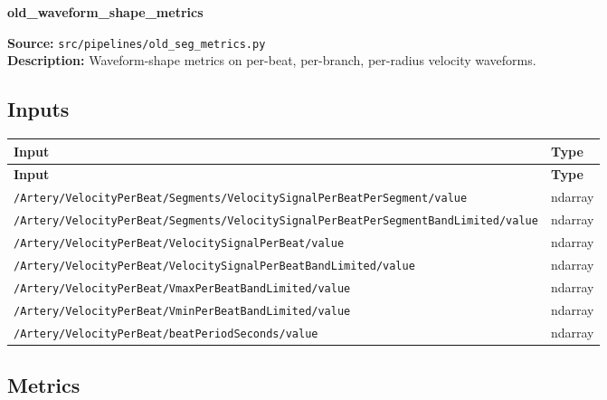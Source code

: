 \documentclass[11pt]{article}
\begin{document}
\begin{center}
\LARGE\textbf{old\_waveform\_shape\_metrics}
\end{center}
\textbf{Source:} \texttt{src/\allowbreak{}pipelines/\allowbreak{}old\_\allowbreak{}seg\_\allowbreak{}metrics.py}\\
\textbf{Description:} Waveform-shape metrics on per-beat, per-branch, per-radius velocity waveforms.

\subsection*{Inputs}
\begin{longtable}{|p{}|p{}|}
\hline
\textbf{Input} & \textbf{Type} \\ \hline
\endfirsthead
\hline
\textbf{Input} & \textbf{Type} \\ \hline
\endhead
{\scriptsize \texttt{/\allowbreak{}Artery/\allowbreak{}VelocityPerBeat/\allowbreak{}Segments/\allowbreak{}VelocitySignalPerBeatPerSegment/\allowbreak{}value}} & ndarray \\ \hline
{\scriptsize \texttt{/\allowbreak{}Artery/\allowbreak{}VelocityPerBeat/\allowbreak{}Segments/\allowbreak{}VelocitySignalPerBeatPerSegmentBandLimited/\allowbreak{}value}} & ndarray \\ \hline
{\scriptsize \texttt{/\allowbreak{}Artery/\allowbreak{}VelocityPerBeat/\allowbreak{}VelocitySignalPerBeat/\allowbreak{}value}} & ndarray \\ \hline
{\scriptsize \texttt{/\allowbreak{}Artery/\allowbreak{}VelocityPerBeat/\allowbreak{}VelocitySignalPerBeatBandLimited/\allowbreak{}value}} & ndarray \\ \hline
{\scriptsize \texttt{/\allowbreak{}Artery/\allowbreak{}VelocityPerBeat/\allowbreak{}VmaxPerBeatBandLimited/\allowbreak{}value}} & ndarray \\ \hline
{\scriptsize \texttt{/\allowbreak{}Artery/\allowbreak{}VelocityPerBeat/\allowbreak{}VminPerBeatBandLimited/\allowbreak{}value}} & ndarray \\ \hline
{\scriptsize \texttt{/\allowbreak{}Artery/\allowbreak{}VelocityPerBeat/\allowbreak{}beatPeriodSeconds/\allowbreak{}value}} & ndarray \\ \hline
\end{longtable}

\subsection*{Metrics}
\end{document}

